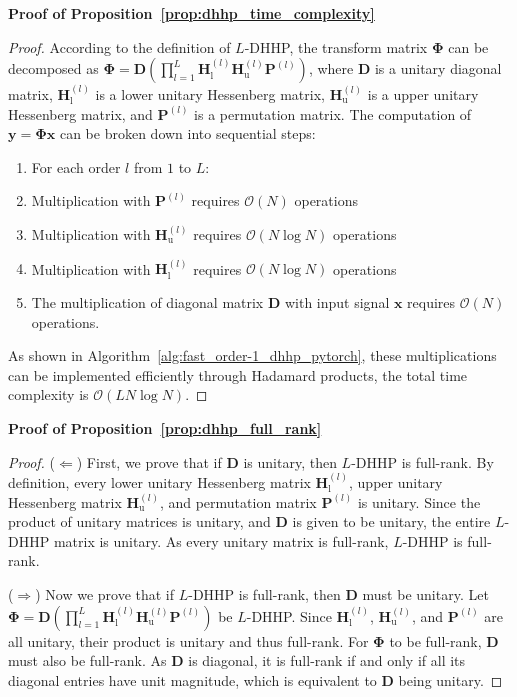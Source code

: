 \noindent\textbf{Proof of Proposition~\ref{prop:dhhp_time_complexity}}
\begin{proof}
According to the definition of $L$-DHHP, the transform matrix $\bm{\Phi}$ can be decomposed as $\bm{\Phi} = \mathbf{D}\left(\prod_{l=1}^{L}\mathbf{H}^{(l)}_{\text{l}}\mathbf{H}^{(l)}_{\text{u}}\mathbf{P}^{(l)}\right)$, where $\mathbf{D}$ is a unitary diagonal matrix, $\mathbf{H}^{(l)}_{\text{l}}$ is a lower unitary Hessenberg matrix, $\mathbf{H}^{(l)}_{\text{u}}$ is a upper unitary Hessenberg matrix, and $\mathbf{P}^{(l)}$ is a permutation matrix. The computation of $\mathbf{y} = \bm{\Phi}\mathbf{x}$ can be broken down into sequential steps:
\begin{enumerate}
    \item For each order $l$ from $1$ to $L$:
        \item Multiplication with $\mathbf{P}^{(l)}$ requires $\mathcal{O}(N)$ operations
        \item Multiplication with $\mathbf{H}^{(l)}_{\text{u}}$ requires $\mathcal{O}(N\log{N})$ operations
        \item Multiplication with $\mathbf{H}^{(l)}_{\text{l}}$ requires $\mathcal{O}(N\log{N})$ operations
    \item The multiplication of diagonal matrix $\mathbf{D}$ with input signal $\mathbf{x}$ requires $\mathcal{O}(N)$ operations.
\end{enumerate}

As shown in Algorithm~\ref{alg:fast_order-1_dhhp_pytorch}, these multiplications can be implemented efficiently through Hadamard products, the total time complexity is $\mathcal{O}(LN\log{N})$.
\end{proof}

\noindent\textbf{Proof of Proposition~\ref{prop:dhhp_full_rank}}
\begin{proof}
($\Leftarrow$) First, we prove that if $\mathbf{D}$ is unitary, then $L$-DHHP is full-rank. By definition, every lower unitary Hessenberg matrix $\mathbf{H}^{(l)}_{\text{l}}$, upper unitary Hessenberg matrix $\mathbf{H}^{(l)}_{\text{u}}$, and permutation matrix $\mathbf{P}^{(l)}$ is unitary. Since the product of unitary matrices is unitary, and $\mathbf{D}$ is given to be unitary, the entire $L$-DHHP matrix is unitary. As every unitary matrix is full-rank, $L$-DHHP is full-rank.

($\Rightarrow$) Now we prove that if $L$-DHHP is full-rank, then $\mathbf{D}$ must be unitary. Let $\bm{\Phi} = \mathbf{D}\left(\prod_{l=1}^{L}\mathbf{H}^{(l)}_{\text{l}}\mathbf{H}^{(l)}_{\text{u}}\mathbf{P}^{(l)}\right)$ be $L$-DHHP. Since $\mathbf{H}^{(l)}_{\text{l}}$, $\mathbf{H}^{(l)}_{\text{u}}$, and $\mathbf{P}^{(l)}$ are all unitary, their product is unitary and thus full-rank. For $\bm{\Phi}$ to be full-rank, $\mathbf{D}$ must also be full-rank.
As $\mathbf{D}$ is diagonal, it is full-rank if and only if all its diagonal entries have unit magnitude, which is equivalent to $\mathbf{D}$ being unitary.
\end{proof}

